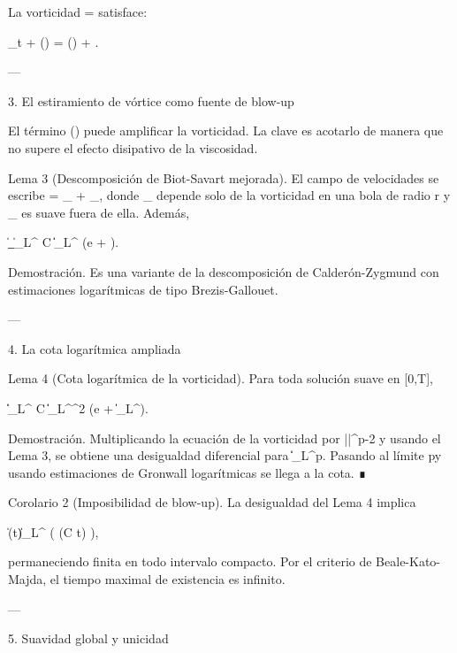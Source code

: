 \documentclass[12pt,twoside]{book}
\begin{document}
La vorticidad \boldsymbol{\omega} = \nabla\times{} satisface:

\partial_t \boldsymbol{\omega} + (\cdot\nabla)\boldsymbol{\omega} = (\boldsymbol{\omega}\cdot\nabla) + \nu \Delta \boldsymbol{\omega}.

---

3. El estiramiento de vórtice como fuente de blow-up

El término (\boldsymbol{\omega}\cdot\nabla) puede amplificar la vorticidad. La clave es acotarlo de manera que no supere el efecto disipativo de la viscosidad.

Lema 3 (Descomposición de Biot-Savart mejorada). El campo de velocidades se escribe  = _{} + _{}, donde _{} depende solo de la vorticidad en una bola de radio r y _{} es suave fuera de ella. Además,

\|\nabla {}_{}\|_{L^\infty} \le C \|\boldsymbol{\omega}\|_{L^\infty} \log\left(e + \right).

Demostración. Es una variante de la descomposición de Calderón-Zygmund con estimaciones logarítmicas de tipo Brezis-Gallouet.

---

4. La cota logarítmica ampliada

Lema 4 (Cota logarítmica de la vorticidad). Para toda solución suave en [0,T],

 \|\boldsymbol{\omega}\|_{L^\infty} \le C \|\boldsymbol{\omega}\|_{L^\infty}^2 \log(e + \|\boldsymbol{\omega}\|_{L^\infty}).

Demostración. Multiplicando la ecuación de la vorticidad por |\boldsymbol{\omega}|^{p-2}\boldsymbol{\omega} y usando el Lema 3, se obtiene una desigualdad diferencial para \|\boldsymbol{\omega}\|_{L^p}. Pasando al límite p\to\infty y usando estimaciones de Gronwall logarítmicas se llega a la cota. ∎

Corolario 2 (Imposibilidad de blow-up). La desigualdad del Lema 4 implica

\|\boldsymbol{\omega}(t)\|_{L^\infty} \le \exp\left( \exp(C t) \right),

permaneciendo finita en todo intervalo compacto. Por el criterio de Beale-Kato-Majda, el tiempo maximal de existencia es infinito.

---

5. Suavidad global y unicidad
\end{document}
